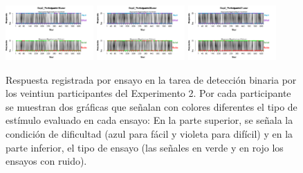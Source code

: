 \documentclass[a4paper ]{article}
\begin{document}
\begin{figure}[th]
\includegraphics[width=0.3\textwidth]{Figures/BiasResp_Exp2_P19} \includegraphics[width=0.3\textwidth]{Figures/BiasResp_Exp2_P20} \includegraphics[width=0.3\textwidth]{Figures/BiasResp_Exp2_P21}
\caption[Respuesta binaria registrada ensayo a ensayo con indicadores de las características de los estímulos presentados; Experimento 2]{Respuesta registrada por ensayo en la tarea de detección binaria por los veintiun participantes del Experimento 2. Por cada participante se muestran dos gráficas que señalan con colores diferentes el tipo de estímulo evaluado en cada ensayo: En la parte superior, se señala la condición de dificultad (azul para fácil y violeta para difícil) y en la parte inferior, el tipo de ensayo (las señales en verde y en rojo los ensayos con ruido).}
\label{fig:BiasResp_E2}
\end{figure}
\end{document}
